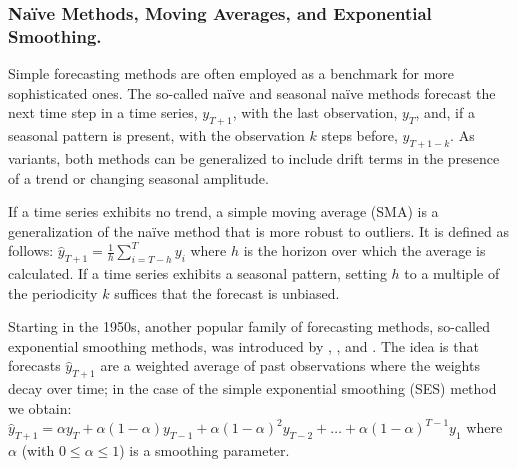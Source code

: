 \subsubsection{Na\"{i}ve Methods, Moving Averages, and Exponential Smoothing.}
\label{ets}

Simple forecasting methods are often employed as a benchmark for more
    sophisticated ones.
The so-called na\"{i}ve and seasonal na\"{i}ve methods forecast the next time
    step in a time series, $y_{T+1}$, with the last observation, $y_T$,
    and, if a seasonal pattern is present, with the observation $k$ steps
    before, $y_{T+1-k}$.
As variants, both methods can be generalized to include drift terms in the
    presence of a trend or changing seasonal amplitude.

If a time series exhibits no trend, a simple moving average (SMA) is a
    generalization of the na\"{i}ve method that is more robust to outliers.
It is defined as follows: $\hat{y}_{T+1} = \frac{1}{h} \sum_{i=T-h}^{T} y_i$
    where $h$ is the horizon over which the average is calculated.
If a time series exhibits a seasonal pattern, setting $h$ to a multiple of the
    periodicity $k$ suffices that the forecast is unbiased.

Starting in the 1950s, another popular family of forecasting methods,
    so-called exponential smoothing methods, was introduced by
    \cite{brown1959}, \cite{holt1957}, and \cite{winters1960}.
The idea is that forecasts $\hat{y}_{T+1}$ are a weighted average of past
    observations where the weights decay over time; in the case of the simple
    exponential smoothing (SES) method we obtain:
$
\hat{y}_{T+1} = \alpha y_T + \alpha (1 - \alpha) y_{T-1}
                + \alpha (1 - \alpha)^2 y_{T-2}
                + \dots + \alpha (1 - \alpha)^{T-1} y_{1}
$
where $\alpha$ (with $0 \le \alpha \le 1$) is a smoothing parameter.

